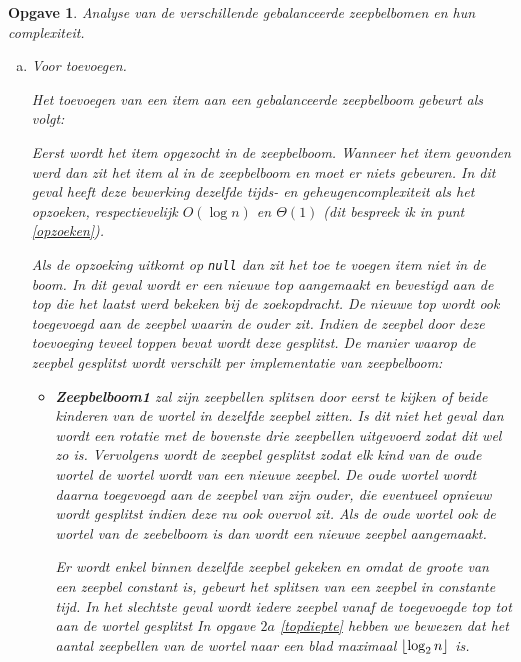\documentclass[12pt,hidelinks]{article}
\DeclarePairedDelimiter\floor{\lfloor}{\rfloor}
\newtheorem{opgave}{Opgave}
\begin{document}
    \begin{opgave}
        Analyse van de verschillende gebalanceerde zeepbelbomen en hun complexiteit.
        \begin{enumerate}[a.]
            \item Voor toevoegen.

                \normalfont
                Het toevoegen van een item aan een gebalanceerde zeepbelboom gebeurt als volgt:

                Eerst wordt het item opgezocht in de zeepbelboom.
                Wanneer het item gevonden werd dan zit het item al in de zeepbelboom en moet er niets gebeuren.
                In dit geval heeft deze bewerking dezelfde tijds- en geheugencomplexiteit als het opzoeken, respectievelijk $O(\log n)$ en $\Theta(1)$ (dit bespreek ik in punt \ref{opzoeken}).

                Als de opzoeking uitkomt op {\tt null} dan zit het toe te voegen item niet in de boom.
                In dit geval wordt er een nieuwe top aangemaakt en bevestigd aan de top die het laatst werd bekeken bij de zoekopdracht.
                De nieuwe top wordt ook toegevoegd aan de zeepbel waarin de ouder zit.
                Indien de zeepbel door deze toevoeging teveel toppen bevat wordt deze gesplitst.
                De manier waarop de zeepbel gesplitst wordt verschilt per implementatie van zeepbelboom:
                \begin{itemize}
                    \item \textbf{Zeepbelboom1} zal zijn zeepbellen splitsen door eerst te kijken of beide kinderen van de wortel in dezelfde zeepbel zitten.
                        Is dit niet het geval dan wordt een rotatie met de bovenste drie zeepbellen uitgevoerd zodat dit wel zo is.
                        Vervolgens wordt de zeepbel gesplitst zodat elk kind van de oude wortel de wortel wordt van een nieuwe zeepbel.
                        De oude wortel wordt daarna toegevoegd aan de zeepbel van zijn ouder, die eventueel opnieuw wordt gesplitst indien deze nu ook overvol zit.
                        Als de oude wortel ook de wortel van de zeebelboom is dan wordt een nieuwe zeepbel aangemaakt.

                        Er wordt enkel binnen dezelfde zeepbel gekeken en omdat de groote van een zeepbel constant is, gebeurt het splitsen van een zeepbel in constante tijd.
                        In het slechtste geval wordt iedere zeepbel vanaf de toegevoegde top tot aan de wortel gesplitst
                        In opgave $2a$ \eqref{topdiepte} hebben we bewezen dat het aantal zeepbellen van de wortel naar een blad maximaal $\floor{\log_2 n}$ is.


\end{itemize}
\end{enumerate}
\end{opgave}
\end{document}
